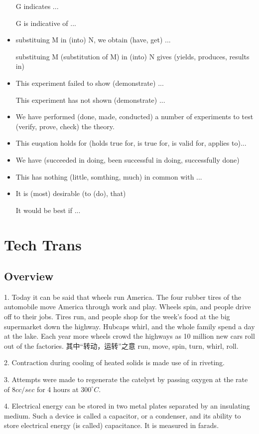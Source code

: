 \documentclass[a4paper,twocolumn,10pt]{article}
\begin{document}
\begin{CJK}{UTF8}{gkai}
\begin{itemize}
	G indicates ...

	G is indicative of ...
\item
	substituing M in (into) N, we obtain (have, get) ...

	substituing M (substitution of M) in (into) N gives (yields, produces, results in)
\item
	This experiment failed to show (demonstrate) ...

	This experiment has not shown (demonstrate) ...
\item
	We have performed (done, made, conducted) a number of experiments to test (verify, prove, check)
	the theory.
\item
	This euqation holds for (holds true for, is true for, is valid for, applies to)...
\item
	We have (succeeded in doing, been successful in doing, successfully done)
\item
	This has nothing (little, somthing, much) in common with ...
\item
	It is (most) desirable (to (do), that)

	It would be best if ...

	\end{itemize}

\section{Tech Trans}

\subsection{Overview}

1. Today it can be said that wheels run America. The four 
rubber tires of the automobile move America through work
and play. Wheels spin, and people drive off to their jobs.
Tires run, and people shop for the week's food at the big 
supermarket down the highway. Hubcaps whirl, and the whole
family spend a day at the lake. Each year more wheels crowd
the highways as 10 million new cars roll out of the factories.
其中“转动，运转”之意 run, move, spin, turn, whirl, roll.

2. Contraction during cooling of heated solids is made use of
in riveting.

3. Attempts were made to regenerate the catelyst by passing oxygen
at the rate of $8 cc/sec$ for 4 hours at $300^\circ C$.

4. Electrical energy can be stored in two metal plates separated by
an insulating medium. Such a device is called a capacitor, or a
condenser, and its ability to store electrical energy (is called)
capacitance. It is measured in farads.


\end{CJK}
\end{document}

